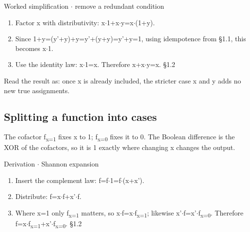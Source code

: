 \documentclass[11pt]{article}
\begin{document}
\begin{keepsection}
\begin{workedbox}{Worked simplification \ensuremath{\cdot} remove a redundant condition}
\begin{enumerate}
\item Factor x with distributivity: x\ensuremath{\cdot}1+x\ensuremath{\cdot}y=x\ensuremath{\cdot}(1+y).
\item Since 1+y=(y'+y)+y=y'+(y+y)=y'+y=1, using idempotence from §1.1, this becomes x\ensuremath{\cdot}1.
\item Use the identity law: x\ensuremath{\cdot}1=x. Therefore x+x\ensuremath{\cdot}y=x. \hfill{\small\color{FAUblue}§1.2}
\end{enumerate}

Read the result as: once x is already included, the stricter case x and y adds no new true assignments.
\end{workedbox}

\begin{keepsection}
\subsection{Splitting a function into cases}

The cofactor f\textsubscript{x=1} fixes x to 1; f\textsubscript{x=0} fixes it to 0. The Boolean difference is the XOR of the cofactors, so it is 1 exactly where changing x changes the output.

\begin{workedbox}{Derivation \ensuremath{\cdot} Shannon expansion}
\begin{enumerate}
\item Insert the complement law: f=f\ensuremath{\cdot}1=f\ensuremath{\cdot}(x+x').
\item Distribute: f=x\ensuremath{\cdot}f+x'\ensuremath{\cdot}f.
\item Where x=1 only f\textsubscript{x=1} matters, so x\ensuremath{\cdot}f=x\ensuremath{\cdot}f\textsubscript{x=1}; likewise x'\ensuremath{\cdot}f=x'\ensuremath{\cdot}f\textsubscript{x=0}. Therefore f=x\ensuremath{\cdot}f\textsubscript{x=1}+x'\ensuremath{\cdot}f\textsubscript{x=0}. \hfill{\small\color{FAUblue}§1.2}
\end{enumerate}
\end{workedbox}


\end{keepsection}
\end{keepsection}
\end{document}
